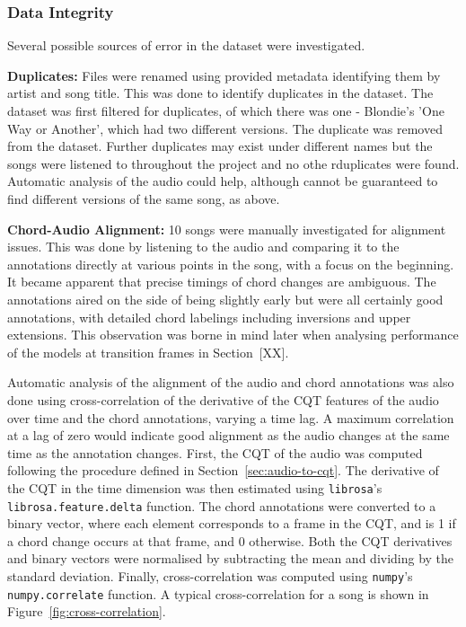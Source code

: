 \subsubsection{Data Integrity}

Several possible sources of error in the dataset were investigated.

\textbf{Duplicates:} Files were renamed using provided metadata identifying them by artist and song title. This was done to identify duplicates in the dataset. The dataset was first filtered for duplicates, of which there was one - Blondie's 'One Way or Another', which had two different versions. The duplicate was removed from the dataset. Further duplicates may exist under different names but the songs were listened to throughout the project and no othe rduplicates were found. Automatic analysis of the audio could help, although cannot be guaranteed to find different versions of the same song, as above.

\textbf{Chord-Audio Alignment:} 10 songs were manually investigated for alignment issues. This was done by listening to the audio and comparing it to the annotations directly at various points in the song, with a focus on the beginning. It became apparent that precise timings of chord changes are ambiguous. The annotations aired on the side of being slightly early but were all certainly good annotations, with detailed chord labelings including inversions and upper extensions. This observation was borne in mind later when analysing performance of the models at transition frames in Section~[XX].

Automatic analysis of the alignment of the audio and chord annotations was also done using cross-correlation of the derivative of the CQT features of the audio over time and the chord annotations, varying a time lag. A maximum correlation at a lag of zero would indicate good alignment as the audio changes at the same time as the annotation changes. First, the CQT of the audio was computed following the procedure defined in Section~\ref{sec:audio-to-cqt}. The derivative of the CQT in the time dimension was then estimated using \texttt{librosa}'s \texttt{librosa.feature.delta} function. The chord annotations were converted to a binary vector, where each element corresponds to a frame in the CQT, and is 1 if a chord change occurs at that frame, and 0 otherwise. Both the CQT derivatives and binary vectors were normalised by subtracting the mean and dividing by the standard deviation. Finally, cross-correlation was computed using \texttt{numpy}'s \texttt{numpy.correlate} function. A typical cross-correlation for a song is shown in Figure~\ref{fig:cross-correlation}.


